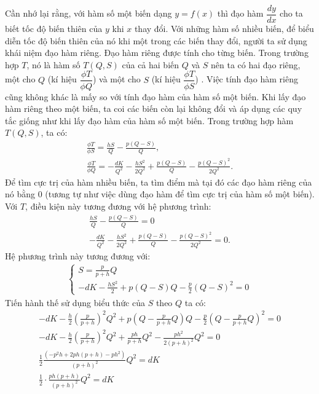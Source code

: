 \begin{multicols}{2}
	\vskip 0.1cm
	Cần nhớ lại rằng, với hàm số một biến dạng $y=f(x)$ thì đạo hàm $\dfrac{dy}{dx}$ cho ta biết tốc độ biến thiên của $y$ khi $x$ thay đổi. Với những hàm số nhiều biến, để biểu diễn tốc độ biến thiên của nó khi một trong các biến thay đổi, người ta sử dụng khái niệm đạo hàm riêng. Đạo hàm riêng được tính cho từng biến. Trong trường hợp $T$, nó là hàm số $T(Q,S)$ của cả hai biến $Q$ và $S$ nên ta có hai đạo riêng, một cho $Q$ (kí hiệu $\dfrac{\phi T}{\phi Q}$) và một cho $S$ (kí hiệu $\dfrac{\phi T}{\phi S}$) . Việc tính đạo hàm riêng cũng không khác là mấy so với tính đạo hàm của hàm số một biến. Khi lấy đạo hàm riêng theo một biến, ta coi các biến còn lại không đổi và áp dụng các quy tắc giống như khi lấy đạo hàm của hàm số một biến.
	\vskip 0.1cm
	Trong trường hợp hàm $T(Q,S)$, ta có:
	\begin{align*}
		\frac{\phi T}{\phi S} = \frac{hS}{Q} - \frac{p(Q-S)}{Q},\\
		\frac{\phi T}{\phi Q} = - \frac{dK}{Q^2} - \frac{hS^2}{2Q^2} + \frac{p(Q-S)}{Q} - \frac{p(Q-S)^2}{2Q^2}.
	\end{align*}
	Để tìm cực trị của hàm nhiều biến, ta tìm điểm mà tại đó các đạo hàm riêng của nó bằng $0$ (tương tự như việc dùng đạo hàm để tìm cực trị của hàm số một biến). Với $T$, điều kiện này tương đương với hệ phương trình:
	\begin{align*}
		\frac{hS}{Q} - \frac{p(Q-S)}{Q}= 0\\
		-\frac{dK}{Q^2} - \frac{hS^2}{2Q^2} + \frac{p(Q-S)}{Q} - \frac{p(Q-S)^2}{2Q^2}= 0.
	\end{align*}
	Hệ phương trình này tương đương với:
	\begin{align*}
		\begin{cases}
			S = \frac{p}{p+h}Q\\
			-dK - \frac{hS^2}{2} + p(Q-S)Q - \frac{p}{2}(Q-S)^2 = 0
		\end{cases}
	\end{align*}
	Tiến hành thế sử dụng biểu thức của $S$ theo $Q$ ta có:
	\begin{align*}
		-dK - \frac{h}{2}\left(\frac{p}{p+h}\right)^2Q^2 + p\left(Q - \frac{p}{p+h}Q\right)Q - \frac{p}{2}\left(Q - \frac{p}{p+h}Q\right)^2 = 0\\
		-dK - \frac{h}{2}\left(\frac{p}{p+h}\right)^2Q^2 + \frac{ph}{p+h}Q^2 - \frac{ph^2}{2(p+h)^2}Q^2 = 0\\
		\frac{1}{2}\frac{\left(-p^2h + 2ph(p+h)-ph^2\right)}{(p+h)^2}Q^2 = dK\\
		\frac{1}{2}\cdot\frac{ph(p+h)}{(p+h)^2}Q^2 = dK\\

\end{align*}
\end{multicols}
